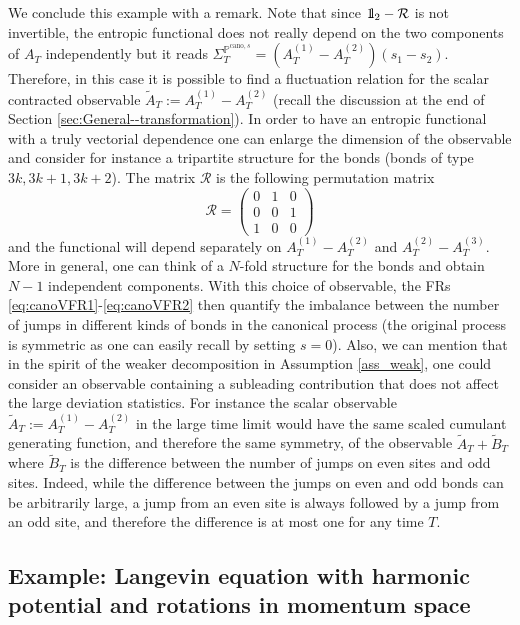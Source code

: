 \documentclass[a4paper,11pt]{article}
\numberwithin{equation}{section}
\newcommand{\bbbone}{\mathchoice {\rm 1\mskip-4mu l} {\rm 1\mskip-4mu l}
{\rm 1\mskip-4.5mu l} {\rm 1\mskip-5mu l}}
\begin{document}
We conclude this example with a remark.
Note that since $\bbbone_2 - \mathcal{R}$ is not invertible, the entropic functional does not really depend on the two components of $A_T$ independently but it reads $\varSigma_{T}^{\mathbb{P}^{\mathrm{cano},s}} = (A_T^{(1)} - A_T^{(2)})(s_1 - s_2)$. Therefore, in this case it is possible to find a fluctuation relation for the scalar contracted observable $ \widetilde{A}_T := A_T^{(1)} - A_T^{(2)}$ (recall the discussion at the end of Section \ref{sec:General--transformation}).
In order to have an entropic functional with a truly vectorial dependence one can enlarge the dimension of the observable and consider for instance a tripartite structure for the bonds (bonds of type $3k, 3k+1, 3k+2$). The matrix $\mathcal{R}$ is the following permutation matrix
$$
\mathcal{R}=\left(\begin{array}{ccc}
0 & 1 & 0\\
0 & 0 & 1\\
1 & 0 & 0
\end{array}\right)
$$
and the functional will depend separately on $A_T^{(1)}-A_T^{(2)}$ and $A_T^{(2)}-A_T^{(3)}$. More in general, one can think of a $N$-fold structure for the bonds and obtain $N-1$ independent components. With this choice of observable, the FRs \eqref{eq:canoVFR1}-\eqref{eq:canoVFR2} then quantify the imbalance between the number of jumps in different kinds of bonds in the canonical process (the original process is symmetric as one can easily recall by setting $s=0$).  Also, we can mention that in the spirit of the weaker decomposition in Assumption \ref{ass_weak}, one could consider an  observable containing a subleading contribution that does not affect the large deviation statistics. For instance the scalar observable $\widetilde{A}_T := A_T^{(1)} - A_T^{(2)}$ in the large time limit would have the same scaled cumulant generating function, and therefore the same symmetry, of the observable $\widetilde{A}_T+ \widetilde{B}_T$ where $\widetilde{B}_T$ is the difference between the number of jumps on even sites and odd sites. Indeed, while the difference between the jumps on even and odd bonds can be arbitrarily large, a jump from an even site is always followed by a jump from an odd site, and therefore the difference is at most one for any time $T$.



\subsection{Example: Langevin equation with harmonic potential and rotations in momentum space}
\end{document}
